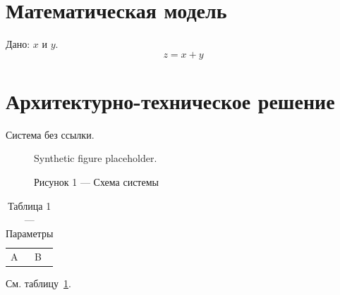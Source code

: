 \documentclass{gostcheck-vkr}
\begin{document}
\section{Математическая модель}
Дано: $x$ и $y$.
\begin{equation}
z = x + y
\end{equation}
\section{Архитектурно-техническое решение}
Система без ссылки.
\begin{figure}
\centering
Synthetic figure placeholder.
\caption{Рисунок 1 — Схема системы}
\label{fig:demo}
\end{figure}
\begin{table}
\caption{Таблица 1 — Параметры}
\label{tab:demo}
\begin{tabular}{ll}
A & B \\
\end{tabular}
\end{table}
См. таблицу~\ref{tab:demo}.
\end{document}
